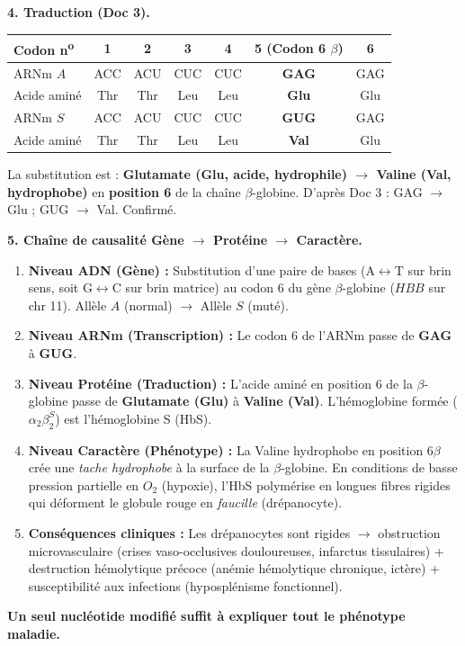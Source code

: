 \documentclass[11pt]{article}
\begin{document}
\begin{exoresolu}
\textbf{4. Traduction (Doc 3).}
\begin{center}
\begin{tabular}{l c c c c c c}
Codon n\textsuperscript{o} & 1 & 2 & 3 & 4 & \textbf{5 (Codon 6 $\beta$)} & 6 \\
\hline
ARNm $A$ & ACC & ACU & CUC & CUC & \textbf{GAG} & GAG \\
Acide aminé & Thr & Thr & Leu & Leu & \textbf{Glu} & Glu \\
\hline
ARNm $S$ & ACC & ACU & CUC & CUC & \textbf{GUG} & GAG \\
Acide aminé & Thr & Thr & Leu & Leu & \textbf{Val} & Glu \\
\end{tabular}
\end{center}
La substitution est : \textbf{Glutamate (Glu, acide, hydrophile) $\rightarrow$ Valine (Val, hydrophobe)} en \textbf{position 6} de la chaîne $\beta$-globine.
D'après Doc 3 : GAG $\rightarrow$ Glu ; GUG $\rightarrow$ Val. Confirmé.

\textbf{5. Chaîne de causalité Gène $\rightarrow$ Protéine $\rightarrow$ Caractère.}
\begin{enumerate}
\item \textbf{Niveau ADN (Gène) :} Substitution d'une paire de bases (A$\leftrightarrow$T sur brin sens, soit G$\leftrightarrow$C sur brin matrice) au codon 6 du gène $\beta$-globine ($HBB$ sur chr 11). Allèle $A$ (normal) $\rightarrow$ Allèle $S$ (muté).
\item \textbf{Niveau ARNm (Transcription) :} Le codon 6 de l'ARNm passe de \textbf{GAG} à \textbf{GUG}.
\item \textbf{Niveau Protéine (Traduction) :} L'acide aminé en position 6 de la $\beta$-globine passe de \textbf{Glutamate (Glu)} à \textbf{Valine (Val)}. L'hémoglobine formée ($\alpha_2\beta_2^S$) est l'hémoglobine S (HbS).
\item \textbf{Niveau Caractère (Phénotype) :} La Valine hydrophobe en position 6$\beta$ crée une \emph{tache hydrophobe} à la surface de la $\beta$-globine. En conditions de basse pression partielle en $O_2$ (hypoxie), l'HbS polymérise en longues fibres rigides qui déforment le globule rouge en \emph{faucille} (drépanocyte).
\item \textbf{Conséquences cliniques :} Les drépanocytes sont rigides $\rightarrow$ obstruction microvasculaire (crises vaso-occlusives douloureuses, infarctus tissulaires) + destruction hémolytique précoce (anémie hémolytique chronique, ictère) + susceptibilité aux infections (hyposplénisme fonctionnel).
\end{enumerate}
\textbf{Un seul nucléotide modifié suffit à expliquer tout le phénotype maladie.}


\end{exoresolu}
\end{document}
